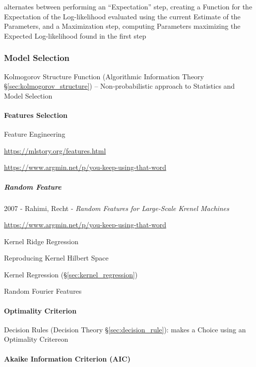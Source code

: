 alternates between performing an ``Expectation'' step, creating a Function for
the Expectation of the Log-likelihood evaluated using the current Estimate of
the Parameters, and a Maximization step, computing Parameters maximizing the
Expected Log-likelihood found in the first step



\subsubsection{Model Selection}\label{sec:model_selection}

Kolmogorov Structure Function (Algorithmic Information Theory
\S\ref{sec:kolmogorov_structure}) -- Non-probabilistic approach to Statistics
and Model Selection



\paragraph{Features Selection}\label{sec:feature_selection}\hfill

Feature Engineering

\url{https://mlstory.org/features.html}

\url{https://www.argmin.net/p/you-keep-using-that-word}



\subparagraph{Random Feature}\label{sec:random_feature}\hfill

2007 - Rahimi, Recht - \emph{Random Features for Large-Scale Krenel Machines}

\url{https://www.argmin.net/p/you-keep-using-that-word}

Kernel Ridge Regression

Reproducing Kernel Hilbert Space

Kernel Regression (\S\ref{sec:kernel_regression})

Random Fourier Features



\paragraph{Optimality Criterion}\label{sec:optimality_criterion}\hfill

\fist Decision Rules (Decision Theory \S\ref{sec:decision_rule}): makes a
Choice using an Optimality Critereon



\paragraph{Akaike Information Criterion (AIC)}\label{sec:aic}\hfill

